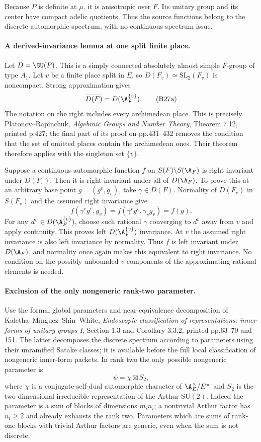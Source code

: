 Because $P$ is definite at $\mu$, it is anisotropic over $F$.
Its unitary group and its center have compact adelic quotients.
Thus the source functions belong to the discrete automorphic
spectrum, with no continuous-spectrum issue.

\paragraph{A derived-invariance lemma at one split finite place.}
Let $D=\SU(P)$.  This is a simply connected absolutely almost
simple $F$-group of type $A_1$.  Let $v$ be a finite place split
in $E$, so $D(F_v)\simeq\mathrm{SL}_2(F_v)$ is noncompact.
Strong approximation gives
\[
       \overline{D(F)}=D(\A_F^{\{v\}}).
 \tag{B27a}
\]
The notation on the right includes every archimedean place.
This is precisely Platonov--Rapinchuk, \emph{Algebraic Groups
and Number Theory}, Theorem 7.12, printed p.427; the final part
of its proof on pp.431--432 removes the condition that the set
of omitted places contain the archimedean ones.  Their theorem
therefore applies with the singleton set $\{v\}$.

Suppose a continuous automorphic function $f$ on $S(F)\backslash
S(\A_F)$ is right invariant under $D(F_v)$.  Then it is right
invariant under all of $D(\A_F)$.  To prove this at an arbitrary
base point $g=(g^v,g_v)$, take $\gamma\in D(F)$.  Normality of
$D(F_v)$ in $S(F_v)$ and the assumed right invariance give
\[
 f(\gamma^v g^v,g_v)
   =f(\gamma^v g^v,\gamma_v g_v)=f(g).
 \tag{B27b}
\]
For any $d^v\in D(\A_F^{\{v\}})$, choose such rational
$\gamma$ converging to $d^v$ away from $v$ and apply continuity.
This proves left $D(\A_F^{\{v\}})$ invariance.  At $v$ the
assumed right invariance is also left invariance by normality.
Thus $f$ is left invariant under $D(\A_F)$, and normality once
again makes this equivalent to right invariance.  No condition
on the possibly unbounded $v$-components of the approximating
rational elements is needed.

\paragraph{Exclusion of the only nongeneric rank-two parameter.}
Use the formal global parameters and near-equivalence decomposition
of Kaletha--M\'inguez--Shin--White, \emph{Endoscopic classification
of representations: inner forms of unitary groups I},
Section 1.3 and Corollary 3.3.2, printed pp.63--70 and 151.
The latter decomposes the discrete spectrum according to
parameters using their unramified Satake classes; it is available
before the full local classification of nongeneric inner-form
packets.  In rank two the only possible nongeneric parameter is
\[
                         \psi=\chi\boxtimes S_2,
 \tag{B27c}
\]
where $\chi$ is a conjugate-self-dual automorphic character of
$\A_E^\times/E^\times$ and $S_2$ is the two-dimensional
irreducible representation of the Arthur $\mathrm{SU}(2)$.
Indeed the parameter is a sum of blocks of dimensions
$m_i n_i$; a nontrivial Arthur factor has $n_i\ge2$ and
already exhausts the rank two.  Parameters which are sums
of rank-one blocks with trivial Arthur factors are generic,
even when the sum is not discrete.

